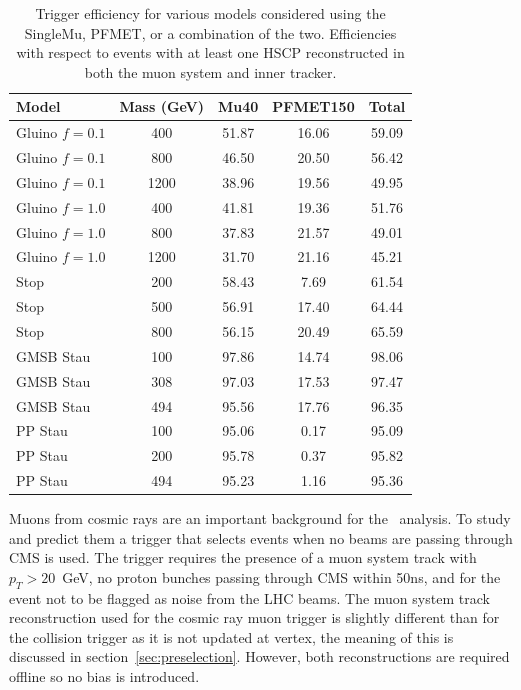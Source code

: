 \begin{table}
 \begin{center}
      \caption[Trigger efficiency for various models considered with respect to events with a reconstructed HSCP in both the muon system and inner tracker]
{Trigger efficiency for various models considered using the SingleMu, PFMET, or a combination of the two.
Efficiencies with respect to events with at least one HSCP reconstructed in both the muon system and inner tracker.}
     \label{tab:triggEffGl}
  \begin{tabular}{|l|c|c|c|c|} \hline
      Model     & Mass (GeV) & Mu40       & PFMET150   & Total                 \\ \hline
 Gluino $f=0.1$ &  400  & 51.87      & 16.06      & 59.09    \\
 Gluino $f=0.1$ &  800  & 46.50      & 20.50      & 56.42    \\
 Gluino $f=0.1$ & 1200  & 38.96      & 19.56      & 49.95    \\
 Gluino $f=1.0$ &  400  & 41.81      & 19.36      & 51.76    \\
 Gluino $f=1.0$ &  800  & 37.83      & 21.57      & 49.01    \\
 Gluino $f=1.0$ & 1200  & 31.70      & 21.16      & 45.21    \\
           Stop &  200  & 58.43      &  7.69      & 61.54    \\
           Stop &  500  & 56.91      & 17.40      & 64.44    \\
           Stop &  800  & 56.15      & 20.49      & 65.59    \\
      GMSB Stau &  100  & 97.86      & 14.74      & 98.06    \\
      GMSB Stau &  308  & 97.03      & 17.53      & 97.47    \\
      GMSB Stau &  494  & 95.56      & 17.76      & 96.35    \\
        PP Stau &  100  & 95.06      &  0.17      & 95.09    \\
        PP Stau &  200  & 95.78      &  0.37      & 95.82    \\
        PP Stau &  494  & 95.23      &  1.16      & 95.36    \\ \hline
  \end{tabular}
 \end{center}
\end{table}

Muons from cosmic rays are an important background for the \muononly\ analysis. To study and predict them a trigger that selects events when no beams are passing through
CMS is used. The trigger requires the presence of a muon system track with $p_T > 20$~GeV, no proton bunches passing through CMS within 50ns, and for the event not to be flagged as
noise from the LHC beams. The muon system track reconstruction used for the cosmic ray muon trigger is slightly 
different than for the collision trigger as it is not updated at vertex,
the meaning of this is discussed in section~\ref{sec:preselection}. However, both reconstructions are required offline so no bias is introduced.